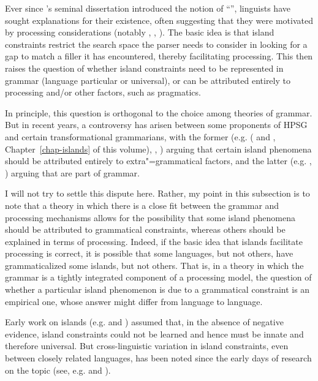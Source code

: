 \documentclass[a4paper]{article}
\begin{document}
Ever since \citeauthor{Ross67}'s seminal dissertation \citeyearpar{Ross67} introduced the notion of ``'', linguists have sought explanations for their existence, often suggesting that they were motivated by processing considerations (notably \citet{Grosu72-u}, \citet{Fodor83}, \citet{Deane91}).  The basic idea is that island constraints restrict the search space the parser needs to consider in looking for a gap to match a filler it has encountered, thereby facilitating processing.  This then raises the question of whether island constraints need to be represented in grammar (language particular or universal), or can be attributed entirely to processing and/or other factors, such as pragmatics.

In principle, this question is orthogonal to the choice among theories of grammar.  But in recent
years, a controversy has arisen between some proponents of HPSG and certain transformational
grammarians, with the former (e.g. \citeauthor{Chaves2012} (\citeyear{Chaves2012} and
\citeyear{chapters/islands}, Chapter~\ref{chap-islands} of this volume), \citet{HofmeisterSag2010}, \citet*{HofmeisterEtal2013}) arguing that certain island phenomena should be attributed entirely to extra"=grammatical factors, and the latter (e.g. \citet{Phillips2013}, \citet{SWP2012a-u}) arguing that  are part of grammar.

I will not try to settle this dispute here.  Rather, my point in this subsection is to note that a theory in which there is a close fit between the grammar and processing mechanisms allows for the possibility that some island phenomena should be attributed to grammatical constraints, whereas others should be explained in terms of processing.  Indeed, if the basic idea that islands facilitate processing is correct, it is possible that some languages, but not others, have grammaticalized some islands, but not others.  That is, in a theory in which the grammar is a tightly integrated component of a processing model, the question of whether a particular island phenomenon is due to a grammatical constraint is an empirical one, whose answer might differ from language to language. 

Early work on islands (e.g. \citet{Ross67} and \citet{Chomsky73a}) assumed that, in the absence of negative evidence, island constraints could not be learned and hence must be innate and therefore universal.  But cross-linguistic variation in island constraints, even between closely related languages, has been noted since the early days of research on the topic (see, e.g. \citet{Erteschik73a-u} and \citet{EngdahlEjerhed82}).
\end{document}

